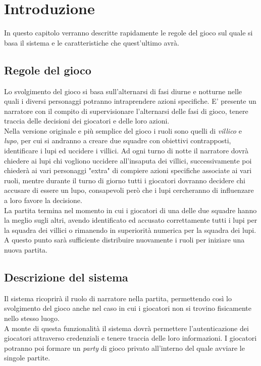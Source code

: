 \chapter{Introduzione}

In questo capitolo verranno descritte rapidamente le regole del gioco \cite{mafiaWikipedia} sul quale si basa il sistema e le caratteristiche che quest'ultimo avrà.

\section{Regole del gioco}
Lo svolgimento del gioco si basa sull'alternarsi di fasi diurne e notturne nelle quali i diversi personaggi potranno intraprendere azioni specifiche. E' presente un narratore con il compito di supervisionare l'alternarsi delle fasi di gioco, tenere traccia delle decisioni dei giocatori e delle loro azioni.\\[\baselineskip]\indent
Nella versione originale e più semplice del gioco i ruoli sono quelli di \emph{villico} e \emph{lupo}, per cui si andranno a creare due squadre con obiettivi contrapposti, identificare i lupi ed uccidere i villici. Ad ogni turno di notte il narratore dovrà chiedere ai lupi chi vogliono uccidere all'insaputa dei villici, successivamente poi chiederà ai vari personaggi "extra" di compiere azioni specifiche associate ai vari ruoli, mentre durante il turno di giorno tutti i giocatori dovranno decidere chi accusare di essere un lupo, consapevoli però che i lupi cercheranno di influenzare a loro favore la decisione. \\[\baselineskip]\indent
La partita termina nel momento in cui i giocatori di una delle due squadre hanno la meglio sugli altri, avendo identificato ed accusato correttamente tutti i lupi per la squadra dei villici o rimanendo in superiorità numerica per la squadra dei lupi. A questo punto sarà sufficiente distribuire nuovamente i ruoli per iniziare una nuova partita.

\section{Descrizione del sistema}

Il sistema ricoprirà il ruolo di narratore nella partita, permettendo così lo svolgimento del gioco anche nel caso in cui i giocatori non si trovino fisicamente nello stesso luogo.\\
A monte di questa funzionalità il sistema dovrà permettere l'autenticazione dei giocatori attraverso credenziali e tenere traccia delle loro informazioni. I giocatori potranno poi formare un \emph{party} di gioco privato all'interno del quale avviare le singole partite.

